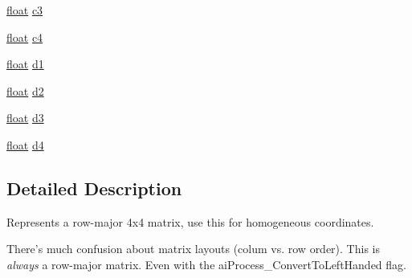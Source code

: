 \begin{DoxyCompactItemize}
\item 
\hyperlink{fmod_8h_aeb841aa4b4b5f444b5d739d865b420af}{float} \hyperlink{structai_matrix4x4_aec8c5745b90139d472eb4e91f1373c1a}{c3}
\item 
\hyperlink{fmod_8h_aeb841aa4b4b5f444b5d739d865b420af}{float} \hyperlink{structai_matrix4x4_a7e3288f38a4e00d55c02272e1582e462}{c4}
\item 
\hyperlink{fmod_8h_aeb841aa4b4b5f444b5d739d865b420af}{float} \hyperlink{structai_matrix4x4_a13f3800d9106e3be6d0e60b794c5a5ae}{d1}
\item 
\hyperlink{fmod_8h_aeb841aa4b4b5f444b5d739d865b420af}{float} \hyperlink{structai_matrix4x4_a6f17ca1c7e4b9377d0e332f85aab282b}{d2}
\item 
\hyperlink{fmod_8h_aeb841aa4b4b5f444b5d739d865b420af}{float} \hyperlink{structai_matrix4x4_a8d2910f62b34b1e2ace93b55e4db4b92}{d3}
\item 
\hyperlink{fmod_8h_aeb841aa4b4b5f444b5d739d865b420af}{float} \hyperlink{structai_matrix4x4_ac0a65b51f126f7331b4f7dbbd82f3d63}{d4}
\end{DoxyCompactItemize}


\subsection{Detailed Description}
Represents a row-\/major 4x4 matrix, use this for homogeneous coordinates. 

There's much confusion about matrix layouts (colum vs. row order). This is {\itshape always} a row-\/major matrix. Even with the ai\-Process\-\_\-\-Convert\-To\-Left\-Handed flag. 

